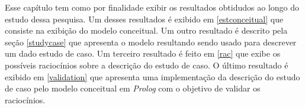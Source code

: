 Esse capítulo tem como por finalidade exibir os resultados obtidudos ao longo do estudo dessa pesquisa. Um desses resultados é exibido em \ref{estconceitual} que consiste na exibição do modelo conceitual. Um outro resultado é descrito pela seção \ref{studycase} que apresenta o modelo resultando sendo usado para descrever um dado estudo de caso. Um terceiro resultado é feito em \ref{rac} que exibe os possíveis raciocínios sobre a descrição do estudo de caso. O último resultado é exibido em \ref{validation} que apresenta uma implementação da descrição do estudo de caso pelo modelo conceitual em \textit{Prolog} com o objetivo de validar os raciocínios.